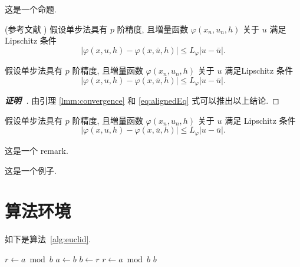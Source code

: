 \begin{proposition}[Proposition]
这是一个命题.
\end{proposition}

\begin{lemma}\label{lmm:convergence} (参考文献 \cite{LiLiu1997})
假设单步法具有 $p$ 阶精度, 且増量函数 $\varphi(x_{n}, u_{n}, h)$ 关于 $u$ 满足 Lipschitz 条件
\begin{equation}\label{eq:conver1}
|\varphi(x, u, h)-\varphi(x, \bar{u}, h)| \leqslant L_{\varphi}|u-\bar{u}|.
\end{equation}
\end{lemma}

\begin{theorem}\label{thm:convergence}
假设单步法具有 $p$ 阶精度, 且増量函数 $\varphi(x_{n}, u_{n}, h)$ 关于 $u$ 满足Lipschitz 条件
\begin{equation}\label{eq:conver2}
|\varphi(x, u, h)-\varphi(x, \bar{u}, h)| \leqslant L_{\varphi}|u-\bar{u}|.
\end{equation}
\end{theorem}
\begin{proof}[\normalfont\bfseries 证明~\nopunct]
由引理 \ref{lmm:convergence} 和 \eqref{eq:alignedEq} 式可以推出以上结论.
\end{proof}

\begin{corollary}\label{col:convergence}
假设单步法具有 $p$ 阶精度, 且増量函数 $\varphi(x_{n}, u_{n}, h)$ 关于 $u$ 满足 Lipschitz 条件
\begin{equation}\label{eq:conver3}
|\varphi(x, u, h)-\varphi(x, \bar{u}, h)| \leqslant L_{\varphi}|u-\bar{u}|.
\end{equation}
\end{corollary}

\begin{remark}\label{rem:remark}
这是一个 remark.
\end{remark}

\begin{example}
这是一个例子.
\end{example}


\clearpage
\section{算法环境}

如下是算法~\ref{alg:euclid}.
\begin{algorithm}[H]
\small
\caption{~Euclid's algorithm}\label{alg:euclid}
\begin{algorithmic}[1]
  \State $r\gets a\bmod b$
  \State $a\gets b$
  \State $b\gets r$
  \State $r\gets a\bmod b$
  \EndWhile\label{euclidendwhile}
  \State \Return $b$
  \EndProcedure
\end{algorithmic}
\end{algorithm}


